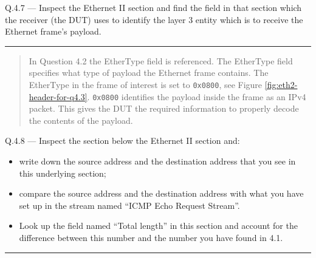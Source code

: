 \documentclass{article}
\newcommand\Que[2]{%
\begin{samepage}
\leavevmode\par
\noindent
Q.#1 --- #2\par\vspace{10pt}\hrule\vspace{10pt}
\end{samepage}}
\newenvironment{ans}
{\fbox{Answer}\begin{quote}\nopagebreak}
{\end{quote}}
\begin{document}
\Que{4.7}{Inspect the Ethernet II section and find the field in
that section which the receiver (the DUT) uses to identify the
layer 3 entity which is to receive the Ethernet frame's
payload.}
\begin{ans}
In Question 4.2 the EtherType field is referenced. The
EtherType field specifies what type of payload the
Ethernet frame contains. The EtherType in the frame of
interest is set to \texttt{0x0800}, see Figure
\ref{fig:eth2-header-for-q4.3}. \texttt{0x0800}
identifies the payload inside the frame as an IPv4
packet. This gives the DUT the required information to
properly decode the contents of the payload.
\end{ans}

\newpage

\Que{4.8}{Inspect the section below the Ethernet II section and:
\begin{itemize}
\item write down the source address and the destination address
      that you see in this underlying section;
\item compare the source address and the destination address with
      what you have set up in the stream named ``ICMP Echo
      Request Stream''.
\item Look up the field named ``Total length'' in this section
      and account for the difference between this number and the
      number you have found in 4.1.
\end{itemize}}
\end{document}
